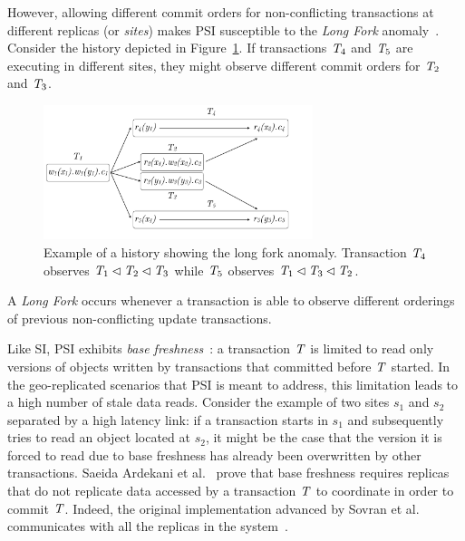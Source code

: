 However, allowing different commit orders for non-conflicting transactions at different replicas (or \emph{sites}) makes PSI susceptible to the \emph{Long Fork} anomaly~\citep{psi-intro}. Consider the history depicted in Figure~\ref{fig:long_fork_history}. If transactions $\mathit{T}_4$ and $\mathit{T}_5$ are executing in different sites, they might observe different commit orders for $\mathit{T}_2$ and $\mathit{T}_3$.

\begin{figure}[h]
  \centering
  \includegraphics[width=0.7\textwidth]{figures/long_fork_hist.pdf}
  \caption{Example of a history showing the long fork anomaly. Transaction $\mathit{T}_4$ observes $\mathit{T}_1 \lhd \mathit{T}_2 \lhd \mathit{T}_3$ while $\mathit{T}_5$ observes $\mathit{T}_1 \lhd \mathit{T}_3 \lhd \mathit{T}_2$.}
  \label{fig:long_fork_history}
\end{figure}

\begin{definition}
A \emph{Long Fork} occurs whenever a transaction is able to observe different orderings of previous non-conflicting update transactions.
\end{definition}

Like SI, PSI exhibits \emph{base freshness}~\citep{ardekani_freshness}: a transaction $\mathit{T}$ is limited to read only versions of objects written by transactions that committed before $\mathit{T}$ started. In the geo-replicated scenarios that PSI is meant to address, this limitation leads to a high number of stale data reads. Consider the example of two sites $s_1$ and $s_2$ separated by a high latency link: if a transaction starts in $s_1$ and subsequently tries to read an object located at $s_2$, it might be the case that the version it is forced to read due to base freshness has already been overwritten by other transactions. Saeida Ardekani et al.~\citep[Theorem 4]{ardekani_si_limits} prove that base freshness requires replicas that do not replicate data accessed by a transaction $\mathit{T}$ to coordinate in order to commit $\mathit{T}$. Indeed, the original implementation advanced by Sovran et al. communicates with all the replicas in the system~\citep{psi-intro}.

